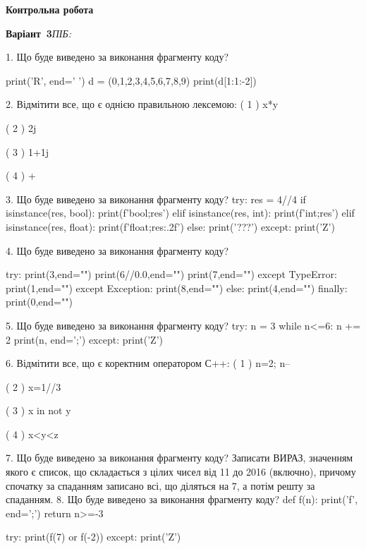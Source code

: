 \documentclass[11pt]{article}
\begin{document}
\newpage

\newpage

{\large\textbf{Контрольна робота}}

\textbf{Варіант \No\,3}\hfill \textit{ПІБ:}\,\underline{\hspace{60mm}}
\vspace{4mm}

1. Що буде виведено за виконання фрагменту коду?

print('R', end=' ')
d = (0,1,2,3,4,5,6,7,8,9)
print(d[1:1:-2])


2. %
Відмітити все, що є однією правильною лексемою:
( 1 ) x*y

( 2 ) 2j

( 3 ) 1+1j

( 4 ) +

3. Що буде виведено за виконання фрагменту коду?
try:
    res = 4//4%
    if isinstance(res, bool):
        print(f'bool;{res}')
    elif isinstance(res, int):
        print(f'int;{res}')
    elif isinstance(res, float):
        print(f'float;{res:.2f}')
    else:
        print('???')
except:
    print('Z')

4. Що буде виведено за виконання фрагменту коду?

try:
    print(3,end="")
    print(6//0.0,end="")
    print(7,end="")
except TypeError: print(1,end="")
except Exception: print(8,end="")
else: print(4,end="")
finally: print(0,end="")

5. Що буде виведено за виконання фрагменту коду?
try:
    n = 3
    while n<=6:
        n += 2
    print(n, end=';')
except:
    print('Z')

6. %
Відмітити все, що є коректним оператором С++:
( 1 ) n=2; n--

( 2 ) x=1//3

( 3 ) x in not y

( 4 ) x<y<z

7. Що буде виведено за виконання фрагменту коду?
Записати ВИРАЗ, значенням якого є список, що складається з цілих чисел від 11 до 2016 (включно), причому спочатку за спаданням записано всі, що діляться на 7, а потім решту за спаданням.
8. Що буде виведено за виконання фрагменту коду?
def f(n):
    print('f', end=';')
    return n>=-3

try:
    print(f(7) or f(-2))
except:
    print('Z')
\end{document}
